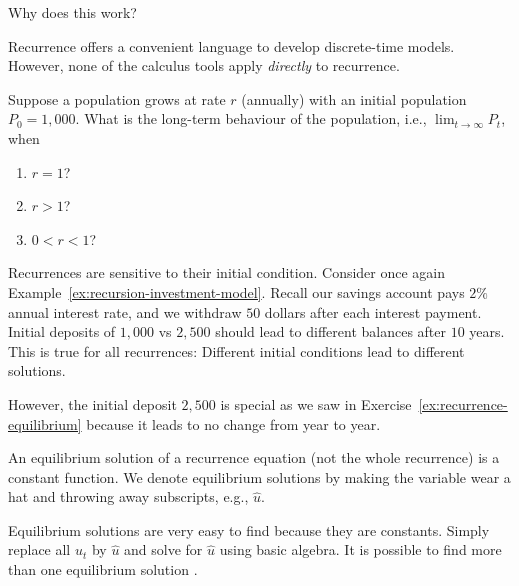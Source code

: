 \documentclass[../main.tex]{subfiles}
\begin{document}
Why does this work?


\faStar{} Recurrence offers a convenient language to develop discrete-time models. However, none of the calculus tools apply \emph{directly} to recurrence. 

\begin{example} \label{ex:recurrence-longterm-growth}
  Suppose a population grows at rate \(r\) (annually) with an initial population \(P_{0} = 1,000\).   What is the long-term behaviour of the population,  i.e., \(\lim_{t \to \infty} P_{t}\), when
  \begin{enumerate}
    \item \(r = 1\)?
    \item \(r > 1\)?
    \item \(0 < r < 1\)?
  \end{enumerate}

  \blanks*
\end{example}
\clearpage


\clearpage

Recurrences are sensitive to their initial condition. Consider once again Example~\ref{ex:recursion-investment-model}. Recall our savings account pays \(2\%\) annual interest rate, and we withdraw  \(50\) dollars after each interest payment.  Initial deposits of \(1,000\) vs \(2,500\) should lead to different balances after \(10\) years.  This is true for all recurrences: Different initial conditions lead to different solutions.

However, the initial deposit \(2,500\) is special as we saw in Exercise~\ref{ex:recurrence-equilibrium} because it leads to no change from year to year.

\begin{definition} \label{def:recurrence-equilibrium}
  An equilibrium solution of a recurrence equation (not the whole recurrence) is a constant function.  We denote equilibrium solutions by making the variable wear a hat and throwing away subscripts, e.g., \(\hat{u}\).
\end{definition}


\faStar{} Equilibrium solutions are very easy to find because they are constants. Simply replace all \(u_{t}\) by \(\hat{u}\) and solve for \(\hat{u}\) using basic algebra. It is possible to find more than one equilibrium solution .
\end{document}
